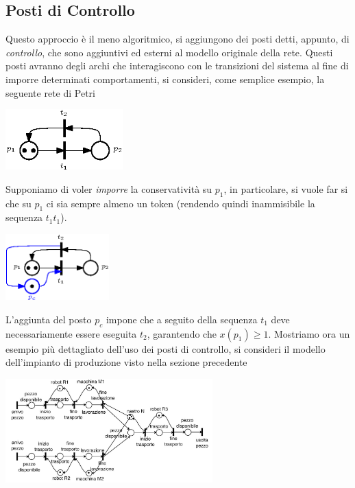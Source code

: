 \documentclass[10pt, letterpaper]{report}
\begin{document}
\subsection{Posti di Controllo}
Questo approccio è il meno algoritmico, si aggiungono dei posti detti, appunto, di \textit{controllo}, che sono aggiuntivi ed esterni al modello originale della rete.  Questi posti avranno degli archi che interagiscono con le transizioni del sistema al fine di imporre determinati comportamenti, si consideri, come semplice esempio, la seguente rete di Petri 
\begin{center}
    \includegraphics[width=0.34\textwidth]{images/PetriControlloPosti1.eps}
\end{center}
Supponiamo di voler \textit{imporre} la conservatività su $p_1$, in particolare, si vuole far si che su $p_1$ ci sia sempre almeno un token (rendendo quindi inammisibile la sequenza $t_1t_1$).
\begin{center}
    \includegraphics[width=0.3\textwidth]{images/PetriControlloPosti2.eps}
\end{center}
L'aggiunta del posto $p_c$ impone che a seguito della sequenza $t_1$ deve necessariamente essere eseguita $t_2$, garantendo che $x(p_1)\ge 1$.\acc 
Mostriamo ora un esempio più dettagliato dell'uso dei posti di controllo, si consideri il modello dell'impianto di produzione visto nella sezione precedente
\begin{center}
    \includegraphics[width=0.6\textwidth]{images/modelloImpiantoPetri.png}
\end{center}
\end{document}
